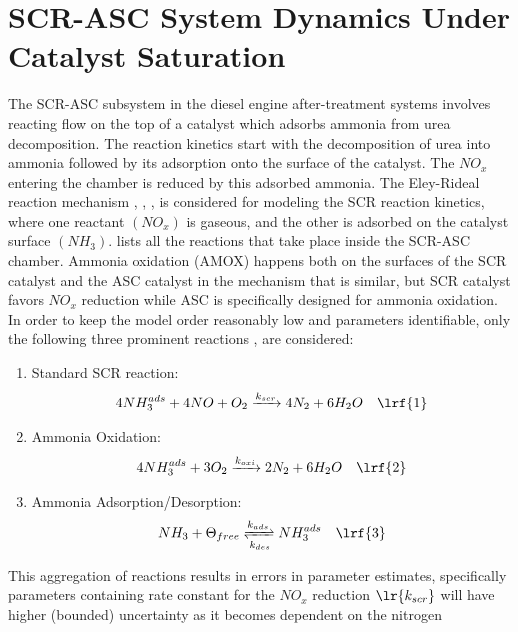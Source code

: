 \section{SCR-ASC System Dynamics Under Catalyst Saturation}
The SCR-ASC subsystem in the diesel engine after-treatment systems involves reacting flow on the top of a catalyst which
adsorbs ammonia from urea decomposition. The reaction kinetics start with the decomposition of urea into ammonia
followed by its adsorption onto the surface of the catalyst. The $NO_x$ entering the chamber is reduced by this adsorbed
ammonia. The Eley-Rideal reaction mechanism \cite{prins2018eley}, \cite{yuan2015diesel}, \cite{hsieh2011development},
\cite{nova2014urea} is considered for modeling the SCR reaction kinetics, where one reactant $(NO_x)$ is gaseous, and
the other is adsorbed on the catalyst surface $(NH_3)$. \cite{nova2014urea} lists all the reactions that take place
inside the SCR-ASC chamber. Ammonia oxidation (AMOX) happens both on the surfaces of the SCR catalyst and the ASC
catalyst in the mechanism that is similar, but SCR catalyst favors $NO_x$ reduction while ASC is specifically designed
for ammonia oxidation.
In order to keep the model order reasonably low and parameters identifiable, only the following three prominent reactions \cite{devarakonda2008adequacy},\cite{hsieh2011development} are considered:
\begin{enumerate}
    \item Standard SCR reaction:
    \begin{align*}
        4 NH_3 ^{ads} + 4 NO + O_2 &\xrightarrow[]{k_{scr}} 4 N_2 + 6 H_2O %
        & \lrf{1}
    \end{align*}
    \item Ammonia Oxidation:
    \begin{align*}
        4 NH_3^{ads} + 3 O_2 &\xrightarrow[]{k_{oxi}} 2 N_2 + 6 H_2O %
        & \lrf{2}
    \end{align*}
    \item Ammonia Adsorption/Desorption:
        \begin{align*}
            NH_3 + \Theta_{free} &\xrightleftharpoons[k_{des}]{k_{ads}} NH_3^{ads}
            & \lrf{3}
        \end{align*}
\end{enumerate}
This aggregation of reactions results in errors in parameter estimates, specifically parameters containing rate constant
for the $NO_x$ reduction $\lr{k_{scr}}$ will have higher (bounded) uncertainty as it becomes dependent on the nitrogen
